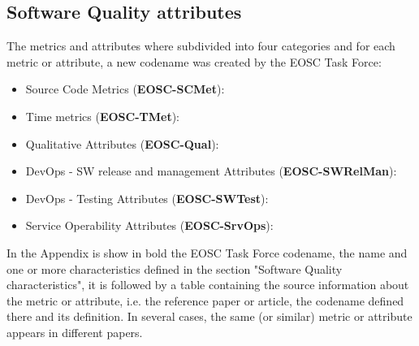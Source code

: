 \subsection{Software Quality attributes}

The metrics and attributes where subdivided into four categories and for each metric or attribute,
a new codename was created by the EOSC Task Force:

\begin{itemize}
    \item Source Code Metrics (\textbf{EOSC-SCMet}):
    \item Time metrics (\textbf{EOSC-TMet}):
    \item Qualitative Attributes (\textbf{EOSC-Qual}):
    \item DevOps - SW release and management Attributes (\textbf{EOSC-SWRelMan}):
    \item DevOps - Testing Attributes (\textbf{EOSC-SWTest}):
    \item Service Operability Attributes (\textbf{EOSC-SrvOps}):
\end{itemize}

In the Appendix is show in bold the EOSC Task Force codename, the name and
one or more characteristics defined in the section "Software Quality characteristics", it is
followed by a table containing the source information about the metric or attribute, i.e. the
reference paper or article, the codename defined there and its definition. In several cases,
the same (or similar) metric or attribute appears in different papers.
